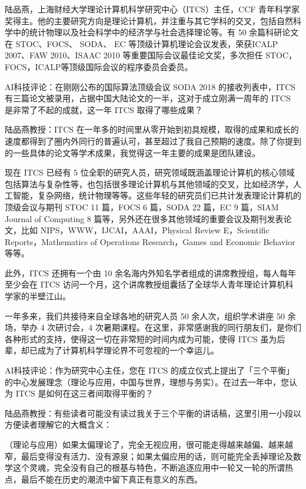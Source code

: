 陆品燕，上海财经大学理论计算机科学研究中心（ITCS）主任，CCF 青年科学家奖得主。他的主要研究方向是理论计算机，并注重与其它学科的交叉，包括自然科学中的统计物理以及社会科学中的经济学与社会选择理论等。有 50 余篇科研论文在 STOC、FOCS、 SODA、 EC 等顶级计算机理论会议发表，荣获ICALP 2007、FAW 2010、ISAAC 2010 等重要国际会议最佳论文奖，多次担任 STOC，FOCS，ICALP等顶级国际会议的程序委员会委员。

AI科技评论：在刚刚公布的国际算法顶级会议 SODA 2018 的接收列表中，ITCS 有三篇论文被录用，占据中国大陆论文的一半，这对于成立刚满一周年的 ITCS 是非常了不起的成就，这一年 ITCS 取得了哪些成果？

陆品燕教授：ITCS 在一年多的时间里从零开始到初具规模，取得的成果和成长的速度都得到了圈内外同行的普遍认可，甚至超过了我自己预期的速度。除了你提到的一些具体的论文等学术成果，我觉得这一年主要的成果是团队建设。

现在 ITCS 已经有 5 位全职的研究人员，研究领域既涵盖理论计算机的核心领域包括算法与复杂性等，也包括很多理论计算机与其他领域的交叉，比如经济学，人工智能，复杂网络，统计物理等等。这些年轻的研究员们已共计发表理论计算机的顶级会议与期刊 STOC 11 篇，FOCS 6 篇，SODA 22 篇，EC 9 篇，SIAM Journal of Computing 8 篇等，另外还在很多其他领域的重要会议及期刊发表论文，比如 NIPS，WWW，IJCAI，AAAI，Physical Review E，Scientific Reports，Mathematics of Operations Research，Games and Economic Behavior 等等。

此外，ITCS 还拥有一个由 10 余名海内外知名学者组成的讲席教授组，每人每年至少会在 ITCS 访问一个月，这个讲席教授组囊括了全球华人青年理论计算机科学家的半壁江山。

一年多来，我们共接待来自全球各地的研究人员 50 余人次，组织学术讲座 50 余场，举办 4 次研讨会，4 次暑期课程。在这里，非常感谢我的同行朋友们，是你们各种形式的支持，使得这一切在非常短的时间内成为可能，使得 ITCS 虽为后辈，却已成为了计算机科学理论界不可忽视的一个幸运儿。

AI科技评论：作为研究中心主任，您在 ITCS 的成立仪式上提出了「三个平衡」的中心发展理念（理论与应用，中国与世界，理想与务实）。在过去一年中，您认为 ITCS 是如何在这三者间取得平衡的？

陆品燕教授：有些读者可能没有读过我关于三个平衡的讲话稿，这里引用一小段以方便读者理解它的大概含义：

（理论与应用）如果太偏理论了，完全无视应用，很可能走得越来越偏、越来越窄，最后变得没有活力、没有源泉；如果太偏应用的话，则可能完全丢掉理论及数学这个灵魂，完全没有自己的根基与特色，不断追逐应用中一轮又一轮的所谓热点，最后不能在历史的潮流中留下真正有意义的东西。

